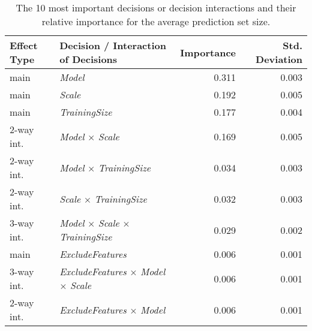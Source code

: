 \begin{table}
\centering
\caption{The 10 most important decisions or decision interactions and their relative importance for the average prediction set size.}
\label{tab:fanova_top10}
\begin{tabular}{llrr}
\toprule
Effect Type &                                      Decision / Interaction of Decisions &  Importance &  Std. Deviation \\
\midrule
       main &                                                           \textit{Model} &       0.311 &           0.003 \\
       main &                                                           \textit{Scale} &       0.192 &           0.005 \\
       main &                                                    \textit{TrainingSize} &       0.177 &           0.004 \\
 2-way int. &                                   \textit{Model} $\times$ \textit{Scale} &       0.169 &           0.005 \\
 2-way int. &                            \textit{Model} $\times$ \textit{TrainingSize} &       0.034 &           0.003 \\
 2-way int. &                            \textit{Scale} $\times$ \textit{TrainingSize} &       0.032 &           0.003 \\
 3-way int. &    \textit{Model} $\times$ \textit{Scale} $\times$ \textit{TrainingSize} &       0.029 &           0.002 \\
       main &                                                 \textit{ExcludeFeatures} &       0.006 &           0.001 \\
 3-way int. & \textit{ExcludeFeatures} $\times$ \textit{Model} $\times$ \textit{Scale} &       0.006 &           0.001 \\
 2-way int. &                         \textit{ExcludeFeatures} $\times$ \textit{Model} &       0.006 &           0.001 \\
\bottomrule
\end{tabular}
\end{table}
